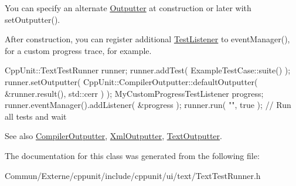 You can specify an alternate \hyperlink{class_outputter}{Outputter} at construction or later with set\+Outputter().

After construction, you can register additional \hyperlink{class_test_listener}{Test\+Listener} to event\+Manager(), for a custom progress trace, for example.


\begin{DoxyCode}
CppUnit::TextTestRunner runner;
runner.addTest( ExampleTestCase::suite() );
runner.setOutputter( CppUnit::CompilerOutputter::defaultOutputter( 
                         &runner.result(),
                         std::cerr ) );
MyCustomProgressTestListener progress;
runner.eventManager().addListener( &progress );
runner.run( \textcolor{stringliteral}{""}, \textcolor{keyword}{true} );    \textcolor{comment}{// Run all tests and wait}
\end{DoxyCode}


\begin{DoxySeeAlso}{See also}
\hyperlink{class_compiler_outputter}{Compiler\+Outputter}, \hyperlink{class_xml_outputter}{Xml\+Outputter}, \hyperlink{class_text_outputter}{Text\+Outputter}. 
\end{DoxySeeAlso}


The documentation for this class was generated from the following file\+:\begin{DoxyCompactItemize}
\item 
Commun/\+Externe/cppunit/include/cppunit/ui/text/Text\+Test\+Runner.\+h\end{DoxyCompactItemize}
